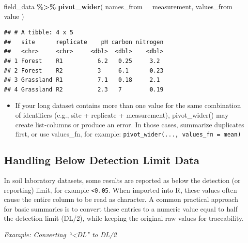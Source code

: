 \documentclass[
  10pt,
  b5paper,
  oneside]{book}
\newenvironment{Shaded}{\begin{snugshade}}{\end{snugshade}}
\newcommand{\AttributeTok}[1]{\textcolor[rgb]{0.13,0.29,0.53}{#1}}
\newcommand{\FunctionTok}[1]{\textcolor[rgb]{0.13,0.29,0.53}{\textbf{#1}}}
\newcommand{\NormalTok}[1]{#1}
\newcommand{\SpecialCharTok}[1]{\textcolor[rgb]{0.81,0.36,0.00}{\textbf{#1}}}
\providecommand{\tightlist}{%
  \setlength{\itemsep}{0pt}\setlength{\parskip}{0pt}}
\begin{document}
\begin{Shaded}
\begin{Highlighting}[]
\NormalTok{field\_data }\SpecialCharTok{\%\textgreater{}\%}
 \FunctionTok{pivot\_wider}\NormalTok{(}
  \AttributeTok{names\_from =}\NormalTok{ measurement,}
  \AttributeTok{values\_from =}\NormalTok{ value}
\NormalTok{ )}
\end{Highlighting}
\end{Shaded}

\begin{verbatim}
## # A tibble: 4 x 5
##   site      replicate    pH carbon nitrogen
##   <chr>     <chr>     <dbl>  <dbl>    <dbl>
## 1 Forest    R1          6.2   0.25     3.2 
## 2 Forest    R2          3     6.1      0.23
## 3 Grassland R1          7.1   0.18     2.1 
## 4 Grassland R2          2.3   7        0.19
\end{verbatim}

\begin{itemize}
\tightlist
\item
  If your long dataset contains more than one value for the same combination of identifiers (e.g., site + replicate + measurement), pivot\_wider() may create list-columns or produce an error.
  In those cases, summarize duplicates first, or use values\_fn, for example:
  \texttt{pivot\_wider(...,\ values\_fn\ =\ mean)}
\end{itemize}

\subsection{Handling Below Detection Limit Data}\label{dl-data}

In soil laboratory datasets, some results are reported as below the detection (or reporting) limit, for example \texttt{\textless{}0.05}. When imported into R, these values often cause the entire column to be read as character. A common practical approach for basic summaries is to convert these entries to a numeric value equal to half the detection limit (DL/2), while keeping the original raw values for traceability.

\emph{Example: Converting ``\textless DL'' to DL/2}
\end{document}
